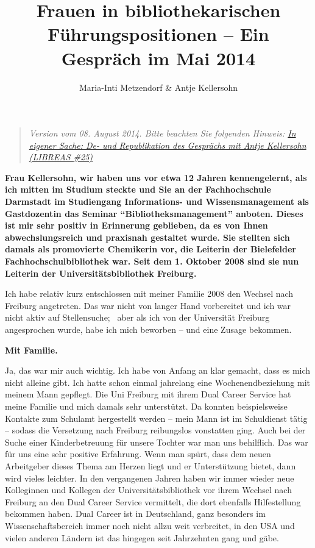 \documentclass[a4paper,
fontsize=11pt,
oneside,
numbers=noperiodatend,
parskip=half-,
bibliography=totoc,
final
]{scrartcl}
\title{\LARGE{Frauen in bibliothekarischen Führungspositionen – Ein Gespräch im Mai 2014}} %
\author{Maria-Inti Metzendorf \& Antje Kellersohn} %
\date{}
\begin{document}
\maketitle
\thispagestyle{fancyplain} 


\begin{quote}
\emph{Version vom 08. August 2014. Bitte beachten Sie folgenden Hinweis:
\href{https://libreas.wordpress.com/2014/08/09/interview_antje_kellersohn/}{In
eigener Sache: De- und Republikation des Gesprächs mit Antje Kellersohn
(LIBREAS \#25)}}
\end{quote}

\textbf{Frau Kellersohn, wir haben uns vor etwa 12 Jahren kennengelernt,
als ich mitten im Studium steckte und Sie an der Fachhochschule
Darmstadt im Studiengang Informations- und Wissensmanagement als
Gastdozentin das Seminar \enquote{Bibliotheksmanagement} anboten. Dieses
ist mir sehr positiv in Erinnerung geblieben, da es von Ihnen
abwechslungsreich und praxisnah gestaltet wurde. Sie stellten sich
damals als promovierte Chemikerin vor, die Leiterin der Bielefelder
Fachhochschulbibliothek war. Seit dem 1. Oktober 2008 sind sie nun
Leiterin der Universitätsbibliothek Freiburg.}

Ich habe relativ kurz entschlossen mit meiner Familie 2008 den Wechsel
nach Freiburg angetreten. Das war nicht von langer Hand vorbereitet und
ich war nicht aktiv auf Stellensuche;~ aber als ich von der Universität
Freiburg angesprochen wurde, habe ich mich beworben -- und eine Zusage
bekommen.~

\textbf{Mit Familie.}

Ja, das war mir auch wichtig. Ich habe von Anfang an klar gemacht, dass
es mich nicht alleine gibt. Ich hatte schon einmal jahrelang eine
Wochenendbeziehung mit meinem Mann gepflegt. Die Uni Freiburg mit ihrem
Dual Career Service hat meine Familie und mich damals sehr unterstützt.
Da konnten beispielsweise Kontakte zum Schulamt hergestellt werden --
mein Mann ist im Schuldienst tätig -- sodass die Versetzung nach
Freiburg reibungslos vonstatten ging. Auch bei der Suche einer
Kinderbetreuung für unsere Tochter war man uns behilflich. Das war für
uns eine sehr positive Erfahrung. Wenn man spürt, dass dem neuen
Arbeitgeber dieses Thema am Herzen liegt und er Unterstützung bietet,
dann wird vieles leichter. In den vergangenen Jahren haben wir immer
wieder neue Kolleginnen und Kollegen der Universitätsbibliothek vor
ihrem Wechsel nach Freiburg an den Dual Career Service vermittelt, die
dort ebenfalls Hilfestellung bekommen haben. Dual Career ist in
Deutschland, ganz besonders im Wissenschaftsbereich immer noch nicht
allzu weit verbreitet, in den USA und vielen anderen Ländern ist das
hingegen seit Jahrzehnten gang und gäbe.~
\end{document}
